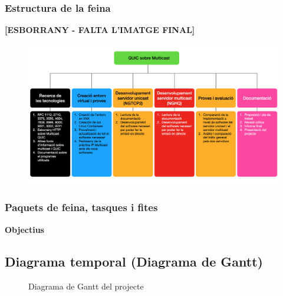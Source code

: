 \subsubsection{Estructura de la feina}
{
    \textbf{[ESBORRANY - FALTA L'IMATGE FINAL]}
    \begin{figure}[H]
        \label{fig:estructura}
        \centering
        \includegraphics[width=15cm]{img/01_introduccio/estructura_treball.png}
    \end{figure}
}
\subsubsection{Paquets de feina, tasques i fites}
{
    \begin{center}
        
        
        
        
        
        
    \end{center}
    \newpage
    \textbf{Objectius}
    
    
}
\subsection{Diagrama temporal (Diagrama de Gantt)}
{
    \label{ssec:gantt}
    \begin{figure}[H]
        \centering
        
        \caption[Diagrama de Gantt del projecte]{\footnotesize{Diagrama de Gantt del projecte}}
        \label{fig:gantt}
    \end{figure}
}
